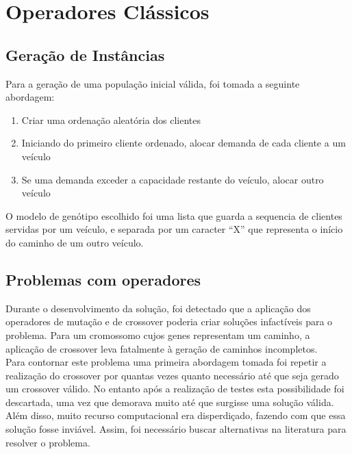 \documentclass[conference]{IEEEtran}
\begin{document}


\section{Operadores Clássicos}



\subsection{Geração de Instâncias}
Para a geração de uma população inicial válida, foi tomada a seguinte abordagem:
\begin{enumerate}
\item Criar uma ordenação aleatória dos clientes
\item Iniciando do primeiro cliente ordenado, alocar demanda de cada cliente a um veículo
\item Se uma demanda exceder a capacidade restante do veículo, alocar outro veículo
\end{enumerate}

O modelo de genótipo escolhido foi uma lista que guarda a sequencia de clientes servidas por um veículo, e separada por um caracter ``X'' que representa o início do caminho de um outro veículo.

\subsection{Problemas com operadores}
Durante o desenvolvimento da solução, foi detectado que a aplicação dos operadores de mutação e de crossover poderia criar soluções infactíveis para o problema. Para um cromossomo cujos genes representam um caminho, a aplicação de crossover leva fatalmente à geração de caminhos incompletos.\\

Para contornar este problema uma primeira abordagem tomada foi repetir a realização do crossover por quantas vezes quanto necessário até que seja gerado um crossover válido. No entanto após a realização de testes esta possibilidade foi descartada, uma vez que demorava muito até que surgisse uma solução válida. Além disso, muito recurso computacional era disperdiçado, fazendo com que essa solução fosse inviável. Assim, foi necessário buscar alternativas na literatura para resolver o problema.
\end{document}
